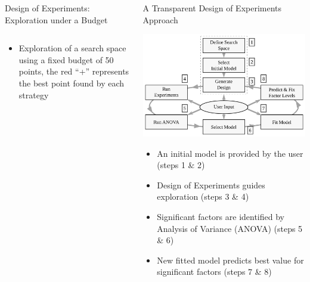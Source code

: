 \documentclass[11pt, compress, aspectratio=169, xcolor={table,usenames,dvipsnames}]{beamer}
\begin{document}
\begin{frame}
\begin{columns}
\begin{column}{0.89\columnwidth}
\begin{columns}
\begin{column}[t]{0.48\columnwidth}
\begin{block}{Design of Experiments: Exploration under a Budget}
\begin{columns}
\begin{column}{0.59\columnwidth}
\begin{itemize}
\item Exploration of a search space using a \alert{fixed budget}
of \alert{50 points}, the \alert{red “+”} represents the best point found by
each strategy
\end{itemize}
\end{column}
\end{columns}
\end{block}
\end{column}
\begin{column}[t]{0.48\columnwidth}
\begin{block}{A Transparent Design of Experiments Approach}
\begin{center}
\includegraphics[width=0.8\columnwidth]{../../../img/doe_anova_strategy.pdf}
\end{center}

\vspace{1em}

\begin{itemize}
\item An \alert{initial model} is provided by the \alert{user} (steps \alert{1} \& \alert{2})
\item \alert{Design of Experiments} guides exploration (steps \alert{3} \& \alert{4})
\item \alert{Significant factors} are identified by \alert{Analysis of Variance (ANOVA)} (steps \alert{5} \& \alert{6})
\item New fitted model predicts best value for significant factors (steps \alert{7} \& \alert{8})


\end{itemize}
\end{block}
\end{column}
\end{columns}
\end{column}
\end{columns}
\end{frame}
\end{document}
